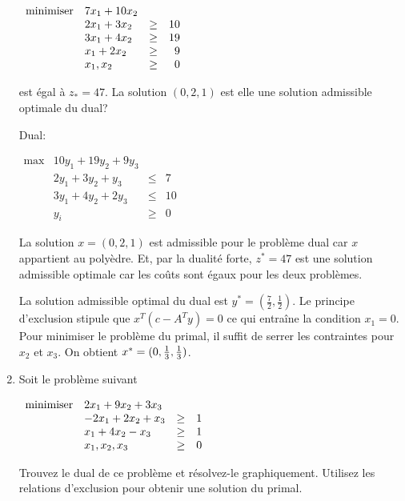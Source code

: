 \begin{enumerate}
    $
    \begin{array}{llcr}
      \mbox{minimiser} & 7x_1+10x_2\\
      & 2x_1+3x_2 & \geq & 10\\
      & 3x_1+4x_2 & \geq & 19\\
      & x_1+2x_2 & \geq & 9\\
      & x_1, x_2 & \geq & 0
    \end{array}
    $

    est égal à $z_*=47$. La solution $(0, 2, 1)$ est elle une solution admissible optimale du dual?


    \begin{solution}
      Dual:

      $
      \begin{array}{llcr}
        \max & 10y_{1} + 19y_{2} + 9y_{3}\\
        & 2y_{1} + 3y_{2} + y_{3} & \leq & 7\\
        & 3y_{1} + 4y_{2} + 2y_{3} & \leq & 10\\
        & y_{i} & \geq & 0
      \end{array}
      $

      La solution $x = (0,2,1)$ est admissible pour le problème dual car $x$ appartient au polyèdre. Et,
      par la dualité forte, $z^{*} = 47$ est une solution admissible optimale car les coûts sont égaux pour les deux problèmes.




      La solution admissible optimal du dual est $y^{*} = (\frac{7}{2}, \frac{1}{2})$. Le principe d'exclusion stipule que $x^{T}(c-A^{T}y) = 0$ ce qui entraîne la condition $x_{1} = 0$.  Pour minimiser le problème du primal, il suffit de serrer les contraintes pour $x_{2}$ et $x_{3}$. On obtient $x^* = (0, \frac{1}{3}, \frac{1}{3})$.
    \end{solution}

  \item Soit le problème suivant

    $
    \begin{array}{llcr}
      \mbox{minimiser} & 2x_1+9x_2+3x_3\\
      & -2x_1+2x_2 +x_3 & \geq & 1\\
      & x_1+4x_2 -x_3 & \geq & 1\\
      & x_1, x_2, x_3 & \geq & 0
    \end{array}
    $

    Trouvez le dual de ce problème et résolvez-le graphiquement. Utilisez les relations d'exclusion pour obtenir une solution du primal.


\end{enumerate}
